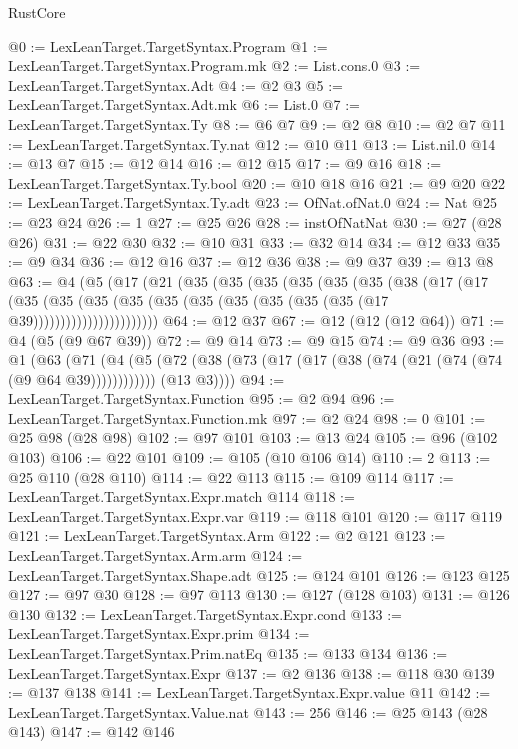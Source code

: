 \begin{lexlean}{RustCore}
\begin{coremodule}
@0 := LexLeanTarget.TargetSyntax.Program
@1 := LexLeanTarget.TargetSyntax.Program.mk
@2 := List.cons.{0}
@3 := LexLeanTarget.TargetSyntax.Adt
@4 := @2 @3
@5 := LexLeanTarget.TargetSyntax.Adt.mk
@6 := List.{0}
@7 := LexLeanTarget.TargetSyntax.Ty
@8 := @6 @7
@9 := @2 @8
@10 := @2 @7
@11 := LexLeanTarget.TargetSyntax.Ty.nat
@12 := @10 @11
@13 := List.nil.{0}
@14 := @13 @7
@15 := @12 @14
@16 := @12 @15
@17 := @9 @16
@18 := LexLeanTarget.TargetSyntax.Ty.bool
@20 := @10 @18 @16
@21 := @9 @20
@22 := LexLeanTarget.TargetSyntax.Ty.adt
@23 := OfNat.ofNat.{0}
@24 := Nat
@25 := @23 @24
@26 := 1
@27 := @25 @26
@28 := instOfNatNat
@30 := @27 (@28 @26)
@31 := @22 @30
@32 := @10 @31
@33 := @32 @14
@34 := @12 @33
@35 := @9 @34
@36 := @12 @16
@37 := @12 @36
@38 := @9 @37
@39 := @13 @8
@63 := @4
    (@5
      (@17
        (@21
          (@35
            (@35
              (@35
                (@35
                  (@35
                    (@35
                      (@38
                        (@17
                          (@17
                            (@35
                              (@35
                                (@35
                                  (@35 (@35 (@35 (@35 (@35 (@35 (@35 (@17 @39)))))))))))))))))))))))
@64 := @12 @37
@67 := @12 (@12 (@12 @64))
@71 := @4 (@5 (@9 @67 @39))
@72 := @9 @14
@73 := @9 @15
@74 := @9 @36
@93 := @1
    (@63
      (@71
        (@4
          (@5 (@72 (@38 (@73 (@17 (@17 (@38 (@74 (@21 (@74 (@74 (@9 @64 @39))))))))))))
          (@13 @3))))
@94 := LexLeanTarget.TargetSyntax.Function
@95 := @2 @94
@96 := LexLeanTarget.TargetSyntax.Function.mk
@97 := @2 @24
@98 := 0
@101 := @25 @98 (@28 @98)
@102 := @97 @101
@103 := @13 @24
@105 := @96 (@102 @103)
@106 := @22 @101
@109 := @105 (@10 @106 @14)
@110 := 2
@113 := @25 @110 (@28 @110)
@114 := @22 @113
@115 := @109 @114
@117 := LexLeanTarget.TargetSyntax.Expr.match @114
@118 := LexLeanTarget.TargetSyntax.Expr.var
@119 := @118 @101
@120 := @117 @119
@121 := LexLeanTarget.TargetSyntax.Arm
@122 := @2 @121
@123 := LexLeanTarget.TargetSyntax.Arm.arm
@124 := LexLeanTarget.TargetSyntax.Shape.adt
@125 := @124 @101
@126 := @123 @125
@127 := @97 @30
@128 := @97 @113
@130 := @127 (@128 @103)
@131 := @126 @130
@132 := LexLeanTarget.TargetSyntax.Expr.cond
@133 := LexLeanTarget.TargetSyntax.Expr.prim
@134 := LexLeanTarget.TargetSyntax.Prim.natEq
@135 := @133 @134
@136 := LexLeanTarget.TargetSyntax.Expr
@137 := @2 @136
@138 := @118 @30
@139 := @137 @138
@141 := LexLeanTarget.TargetSyntax.Expr.value @11
@142 := LexLeanTarget.TargetSyntax.Value.nat
@143 := 256
@146 := @25 @143 (@28 @143)
@147 := @142 @146

\end{coremodule}
\end{lexlean}
